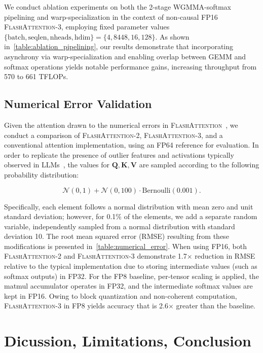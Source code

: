 \begin{enumerate}
We conduct ablation experiments on both the 2-stage WGMMA-softmax pipelining and warp-specialization in the context of non-causal FP16 \textsc{FlashAttention-3}, employing fixed parameter values $\{\text{batch}, \text{seqlen}, \text{nheads}, \text{hdim}\} = \{ 4, 8448, 16, 128\}$. As shown in~\cref{table:ablation_pipelining}, our results demonstrate that incorporating asynchrony via warp-specialization and enabling overlap between GEMM and softmax operations yields notable performance gains, increasing throughput from 570 to 661 TFLOPs.

\subsection{Numerical Error Validation}
\label{sec:numerical_error}

Given the attention drawn to the numerical errors in \textsc{FlashAttention}~\citep{golden2024flash}, we conduct a comparison of \textsc{FlashAttention-2}, \textsc{FlashAttention-3}, and a conventional attention implementation, using an FP64 reference for evaluation. In order to replicate the presence of outlier features and activations typically observed in LLMs~\citep{dettmers2208llm, sun2024massive}, the values for $\mathbf{Q}, \mathbf{K}, \mathbf{V}$ are sampled according to the following probability distribution:

\begin{equation*}
  \mathcal{N}(0, 1) + \mathcal{N}(0, 100) \cdot \mathrm{Bernoulli}(0.001).
\end{equation*}

Specifically, each element follows a normal distribution with mean zero and unit standard deviation; however, for 0.1\% of the elements, we add a separate random variable, independently sampled from a normal distribution with standard deviation 10. The root mean squared error (RMSE) resulting from these modifications is presented in~\cref{table:numerical_error}. When using FP16, both \textsc{FlashAttention-2} and \textsc{FlashAttention-3} demonstrate 1.7$\times$ reduction in RMSE relative to the typical implementation due to storing intermediate values (such as softmax outputs) in FP32. For the FP8 baseline, per-tensor scaling is applied, the matmul accumulator operates in FP32, and the intermediate softmax values are kept in FP16. Owing to block quantization and non-coherent computation, \textsc{FlashAttention-3} in FP8 yields accuracy that is 2.6$\times$ greater than the baseline.

\section{Dicussion, Limitations, Conclusion}
\label{sec:discussion}


\end{enumerate}
